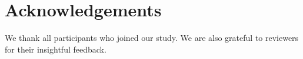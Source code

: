 \section{Acknowledgements}
\label{sec:Conclusion}
We thank all participants who joined our study. We are also grateful to reviewers for their insightful feedback. 
